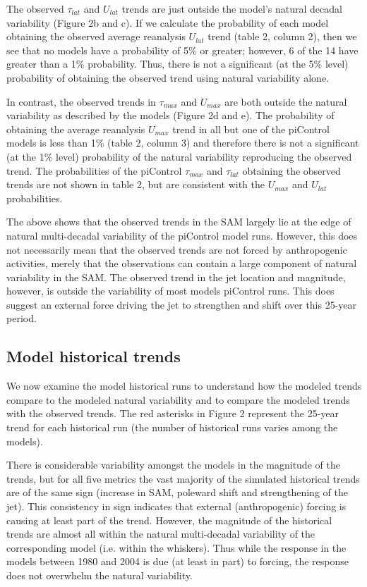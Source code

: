 The observed $\tau_{lat}$ and $U_{lat}$ trends are just outside the model's
natural decadal variability (Figure 2b and c).  If we calculate the probability
of each model obtaining the observed average reanalysis $U_{lat}$ trend (table
2, column 2), then we see that no models have a probability of 5\% or greater;
however, 6 of the 14 have greater than a 1\% probability. Thus, there is not a
significant (at the 5\% level) probability of obtaining the observed trend using
natural variability alone.

In contrast, the observed trends in $\tau_{max}$ and $U_{max}$ are both outside
the natural variability as described by the models (Figure 2d and e). The
probability of obtaining the average reanalysis $U_{max}$ trend in all but one
of the piControl models is less than 1\% (table 2, column 3) and therefore there
is not a significant (at the 1\% level) probability of the natural variability
reproducing the observed trend. The probabilities of the piControl $\tau_{max}$
and $\tau_{lat}$ obtaining the observed trends are not shown in table 2, but are
consistent with the $U_{max}$ and $U_{lat}$ probabilities.

The above shows that the observed trends in the SAM largely lie at the edge of
natural multi-decadal variability of the piControl model runs. However, this
does not necessarily mean that the observed trends are not forced by
anthropogenic activities, merely that the observations can contain a large
component of natural variability in the SAM. The observed trend in the jet
location and magnitude, however, is outside the variability of most models
piControl runs. This does suggest an external force driving the jet to
strengthen and shift over this 25-year period.

\subsection{Model historical trends}

We now examine the model historical runs to understand how the modeled trends
compare to the modeled natural variability and to compare the modeled trends
with the observed trends. The red asterisks in Figure 2 represent the 25-year
trend for each historical run (the number of historical runs varies among the
models).

There is considerable variability amongst the models in the magnitude of the
trends, but for all five metrics the vast majority of the simulated historical
trends are of the same sign (increase in SAM, poleward shift and strengthening
of the jet). This consistency in sign indicates that external (anthropogenic)
forcing is causing at least part of the trend.  However,  the magnitude of the
historical trends are almost all within the natural multi-decadal variability of
the corresponding model (i.e. within the whiskers). Thus while the response in
the models between 1980 and 2004 is due (at least in part) to forcing, the
response does not overwhelm the natural variability.

